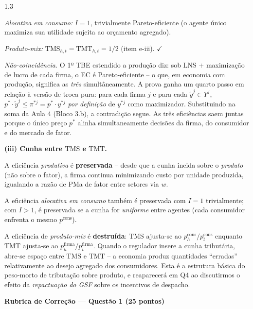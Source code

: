 \documentclass[11pt,addpoints]{exam}
\newcommand{\TMS}{\text{TMS}}
\newcommand{\TMT}{\text{TMT}}
\begin{document}
\begin{spacing}{1.3}
\begin{questions}
\begin{parts}
\begin{solution}
\emph{Alocativa em consumo:} $I = 1$, trivialmente Pareto-eficiente (o agente único maximiza sua utilidade sujeita ao orçamento agregado).

\emph{Produto-mix:} $\TMS_{h,t} = \TMT_{h,t} = 1/2$ (item e-iii). $\checkmark$

\emph{Não-coincidência.} O 1º TBE estendido a produção diz: sob LNS $+$ maximização de lucro de cada firma, o EC é Pareto-eficiente -- o que, em economia com produção, significa as \emph{três} simultâneamente. A prova ganha um quarto passo em relação à versão de troca pura: para cada firma $j$ e para cada $\tilde y^j \in Y^j$, $p^*\cdot \tilde y^j \leq \pi^{*j} = p^*\cdot y^{*j}$ \emph{por definição} de $y^{*j}$ como maximizador. Substituindo na soma da Aula 4 (Bloco 3.b), a contradição segue. As três eficiências saem juntas porque o único preço $p^*$ alinha simultaneamente decisões da firma, do consumidor e do mercado de fator.

\textbf{(iii) Cunha entre $\TMS$ e $\TMT$.}

A eficiência \emph{produtiva} é \textbf{preservada} -- desde que a cunha incida sobre o \emph{produto} (não sobre o fator), a firma continua minimizando custo por unidade produzida, igualando a razão de PMa de fator entre setores via $w$.

A eficiência \emph{alocativa em consumo} também é preservada com $I = 1$ trivialmente; com $I > 1$, é preservada se a cunha for \emph{uniforme} entre agentes (cada consumidor enfrenta o mesmo $p^{\text{cons}}$).

A eficiência de \emph{produto-mix} é \textbf{destruída}: $\TMS$ ajusta-se ao $p^{\text{cons}}_h/p^{\text{cons}}_t$ enquanto $\TMT$ ajusta-se ao $p^{\text{firma}}_h/p^{\text{firma}}_t$. Quando o regulador insere a cunha tributária, abre-se espaço entre $\TMS$ e $\TMT$ -- a economia produz quantidades ``erradas'' relativamente ao desejo agregado dos consumidores. Esta é a estrutura básica do peso-morto de tributação sobre produto, e reaparecerá em Q4 ao discutirmos o efeito da \emph{repactuação do GSF} sobre os incentivos de despacho.
\end{solution}

\end{parts}

\ifprintanswers
\vspace{1em}
{\color{rubred}
\noindent\textbf{Rubrica de Correção --- Questão 1 (25 pontos)}
\vspace{0.3em}

}
\end{questions}
\end{spacing}
\end{document}
